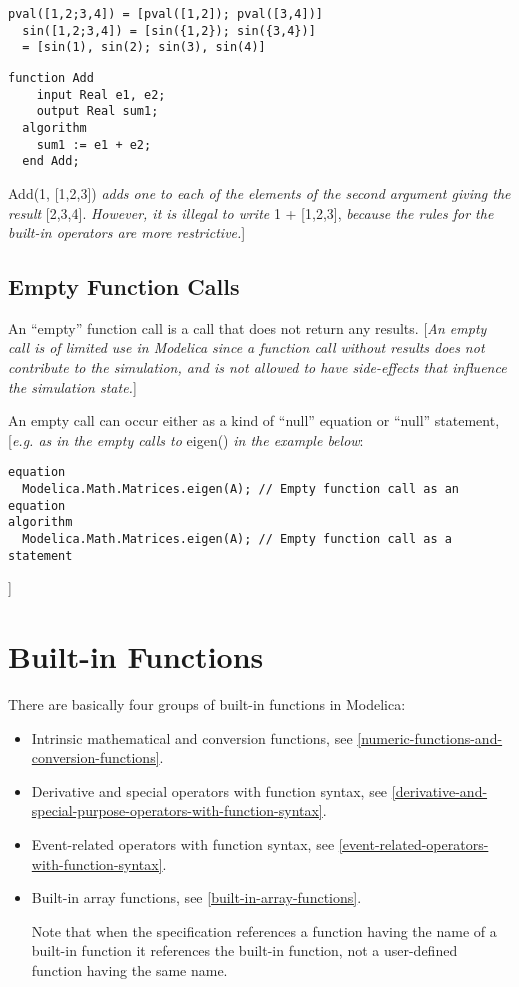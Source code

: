 \begin{lstlisting}[language=modelica]
  pval([1,2;3,4]) = [pval([1,2]); pval([3,4])]
  sin([1,2;3,4]) = [sin({1,2}); sin({3,4})]
  = [sin(1), sin(2); sin(3), sin(4)]
\end{lstlisting}
\begin{lstlisting}[language=modelica]
  function Add
    input Real e1, e2;
    output Real sum1;
  algorithm
    sum1 := e1 + e2;
  end Add;
\end{lstlisting}
Add(1, {[}1,2,3{]}) \emph{adds one to each of the elements of the second
argument giving the result} {[}2,3,4{]}. \emph{However, it is illegal to
write} 1 + {[}1,2,3{]}, \emph{because the rules for the built-in
operators are more restrictive.}{]}

\subsection{Empty Function Calls}

An ``empty'' function call is a call that does not return any results.
{[}\emph{An empty call is of limited use in Modelica since a function
call without results does not contribute to the simulation, and is not
allowed to have side-effects that influence the simulation state.}{]}

An empty call can occur either as a kind of ``null'' equation or
``null'' statement, {[}\emph{e.g. as in the empty calls to} eigen()
\emph{in the example below}:

\begin{lstlisting}[language=modelica]
equation
  Modelica.Math.Matrices.eigen(A); // Empty function call as an equation
algorithm
  Modelica.Math.Matrices.eigen(A); // Empty function call as a statement
\end{lstlisting}
{]}

\section{Built-in Functions}

There are basically four groups of built-in functions in Modelica:

\begin{itemize}
\item
  Intrinsic mathematical and conversion functions, see \autoref{numeric-functions-and-conversion-functions}.
\item
  Derivative and special operators with function syntax, 
  see \autoref{derivative-and-special-purpose-operators-with-function-syntax}.
\item
  Event-related operators with function syntax, see \autoref{event-related-operators-with-function-syntax}.
\item
  Built-in array functions, see \autoref{built-in-array-functions}.

  Note that when the specification references a function having the name
  of a built-in function it references the built-in function, not a
  user-defined function having the same name.
\end{itemize}

